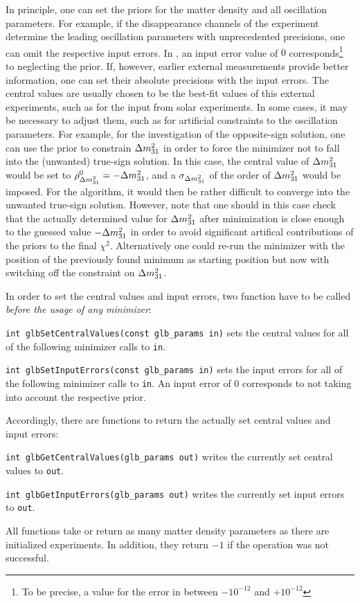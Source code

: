 In principle, one can set the priors for the matter density and all oscillation parameters. For example, if the disappearance channels of the experiment determine the leading oscillation parameters with unprecedented
precisions, one can omit the respective input errors. In \GLOBES , an input error
value of $0$ corresponds\footnote{To be precise, a value for the error
in between $-10^{-12}$ and $+10^{-12}$} to neglecting the prior. If, however,
 earlier external measurements provide better information, one can set their 
absolute precisions with the input errors. The central values are usually 
chosen to be the best-fit values of this external experiments, such as
for the input from solar experiments. In some cases, it may be
necessary to adjust them, such as for artificial constraints to the
oscillation parameters. 
For example, for the investigation of the
opposite-sign solution, one can use the prior to constrain $\Delta m_{31}^2$
in order to force the minimizer not to  fall into the (unwanted) 
true-sign solution. In this case, the central value of $\Delta m_{31}^2$ would 
be set to $\rho^0_{\Delta m_{31}^2} = - \Delta m_{31}^2$, and a $\sigma_{\Delta m_{31}^2}$ of the order 
of $\Delta m_{31}^2$ would be imposed. For the algorithm, it would 
then be rather difficult 
to converge into the unwanted true-sign solution. However, note that 
one should in this case check that the actually determined value 
for $\Delta m_{31}^2$ after minimization is close enough to the guessed value $-\Delta m_{31}^2$ 
in order to avoid significant artifical contributions of the priors to the 
final $\chi^2$. Alternatively one could re-run the minimizer with the
position of the previously found minimum as starting position but now
with switching off the constraint on $\Delta m_{31}^2$.

In order to set the central values and input errors, two function have to
 be called {\em before the usage of any minimizer}:
\begin{function}
{\tt int glbSetCentralValues(const glb\_params in)} sets the central values for all of the following minimizer calls to {\tt in}.
\end{function}
\begin{function}
{\tt int glbSetInputErrors(const glb\_params in)}
 sets the input errors for all of the following minimizer calls to {\tt in}.
 An input error of $0$ corresponds to not taking into account the
 respective prior.
\end{function}
Accordingly, there are functions to return the actually set central values
and input errors:
\begin{function}
{\tt int glbGetCentralValues(glb\_params out)} writes the currently
set central values to {\tt out}.
\end{function}
\begin{function}
{\tt int glbGetInputErrors(glb\_params out)}
 writes the currently set input errors to {\tt out}.
\end{function}
All functions take or return as many matter density parameters as there are initialized experiments. In addition, they return $-1$ if the operation
was not successful.


